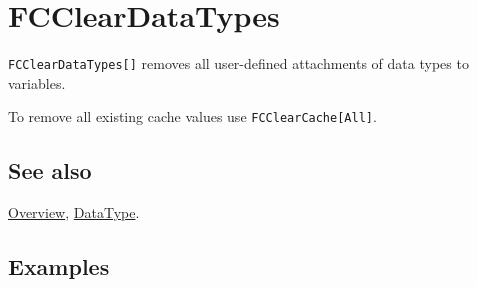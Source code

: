 \documentclass[../FeynCalcManual.tex]{subfiles}
\begin{document}
\hypertarget{fccleardatatypes}{
\section{FCClearDataTypes}\label{fccleardatatypes}}

\texttt{FCClearDataTypes[\allowbreak{}]} removes all user-defined
attachments of data types to variables.

To remove all existing cache values use
\texttt{FCClearCache[\allowbreak{}All]}.

\subsection{See also}

\hyperlink{toc}{Overview}, \hyperlink{datatype}{DataType}.

\subsection{Examples}

\begin{Shaded}
\begin{Highlighting}[]
\OperatorTok{[]}
\end{Highlighting}
\end{Shaded}
\end{document}

